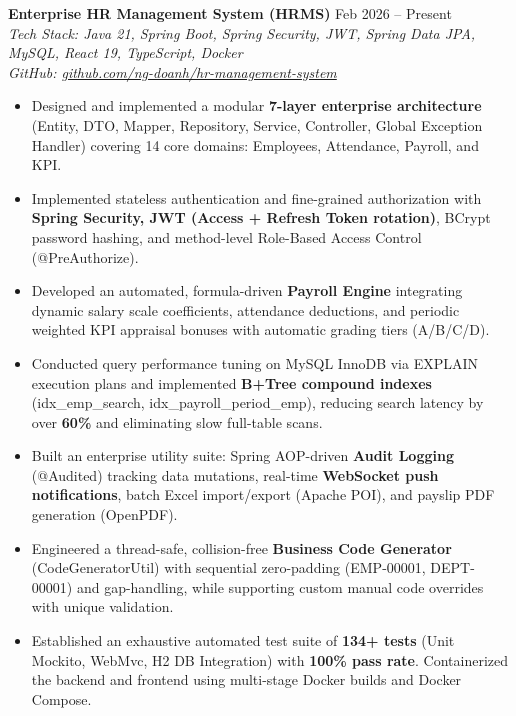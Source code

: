 ﻿\documentclass[10pt,a4paper]{article}
\begin{document}
\textbf{Enterprise HR Management System (HRMS)} \hfill Feb 2026 -- Present \\
\textit{Tech Stack: Java 21, Spring Boot, Spring Security, JWT, Spring Data JPA, MySQL, React 19, TypeScript, Docker} \\
\textit{GitHub: \href{https://github.com/ng-doanh/hr-management-system}{github.com/ng-doanh/hr-management-system}}
\begin{itemize}[leftmargin=1.2em, itemsep=1.8pt, topsep=2pt]
    \item Designed and implemented a modular \textbf{7-layer enterprise architecture} (Entity, DTO, Mapper, Repository, Service, Controller, Global Exception Handler) covering 14 core domains: Employees, Attendance, Payroll, and KPI.
    \item Implemented stateless authentication and fine-grained authorization with \textbf{Spring Security, JWT (Access + Refresh Token rotation)}, BCrypt password hashing, and method-level Role-Based Access Control (@PreAuthorize).
    \item Developed an automated, formula-driven \textbf{Payroll Engine} integrating dynamic salary scale coefficients, attendance deductions, and periodic weighted KPI appraisal bonuses with automatic grading tiers (A/B/C/D).
    \item Conducted query performance tuning on MySQL InnoDB via EXPLAIN execution plans and implemented \textbf{B+Tree compound indexes} (idx\_emp\_search, idx\_payroll\_period\_emp), reducing search latency by over \textbf{60\%} and eliminating slow full-table scans.
    \item Built an enterprise utility suite: Spring AOP-driven \textbf{Audit Logging} (@Audited) tracking data mutations, real-time \textbf{WebSocket push notifications}, batch Excel import/export (Apache POI), and payslip PDF generation (OpenPDF).
    \item Engineered a thread-safe, collision-free \textbf{Business Code Generator} (CodeGeneratorUtil) with sequential zero-padding (EMP-00001, DEPT-00001) and gap-handling, while supporting custom manual code overrides with unique validation.
    \item Established an exhaustive automated test suite of \textbf{134+ tests} (Unit Mockito, WebMvc, H2 DB Integration) with \textbf{100\% pass rate}. Containerized the backend and frontend using multi-stage Docker builds and Docker Compose.
\end{itemize}

\vspace{4pt}
\end{document}
